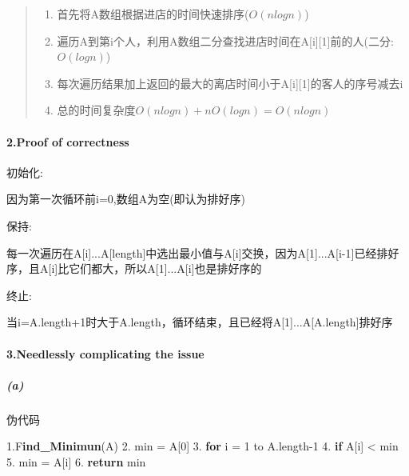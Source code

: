 \documentclass[
]{ctexart}
\newenvironment{Shaded}{}{}
\newcommand{\BuiltInTok}[1]{#1}
\newcommand{\ControlFlowTok}[1]{\textcolor[rgb]{0.00,0.44,0.13}{\textbf{#1}}}
\newcommand{\DecValTok}[1]{\textcolor[rgb]{0.25,0.63,0.44}{#1}}
\newcommand{\ErrorTok}[1]{\textcolor[rgb]{1.00,0.00,0.00}{\textbf{#1}}}
\newcommand{\FloatTok}[1]{\textcolor[rgb]{0.25,0.63,0.44}{#1}}
\newcommand{\NormalTok}[1]{#1}
\begin{document}
\begin{quote}
\begin{enumerate}
\def\labelenumi{\arabic{enumi}.}
\item
  首先将A数组根据进店的时间快速排序(\(O(nlogn)\))
\item
  遍历A到第i个人，利用A数组二分查找进店时间在A{[}i{]}{[}1{]}前的人(二分:\(O(logn)\))
\item
  每次遍历结果加上返回的最大的离店时间小于A{[}i{]}{[}1{]}的客人的序号减去i
\item
  总的时间复杂度\(O(nlogn)+nO(logn)=O(nlogn)\)
\end{enumerate}
\end{quote}

\hypertarget{header-n26}{%
\paragraph{2.Proof of correctness}\label{header-n26}}

初始化:

因为第一次循环前i=0,数组A为空(即认为排好序)

保持:

每一次遍历在A{[}i{]}...A{[}length{]}中选出最小值与A{[}i{]}交换，因为A{[}1{]}...A{[}i-1{]}已经排好序，且A{[}i{]}比它们都大，所以A{[}1{]}...A{[}i{]}也是排好序的

终止:

当i=A.length+1时大于A.length，循环结束，且已经将A{[}1{]}...A{[}A.length{]}排好序

\hypertarget{header-n34}{%
\paragraph{3.Needlessly complicating the issue}\label{header-n34}}

\hypertarget{header-n35}{%
\subparagraph{(a)}\label{header-n35}}

伪代码

\begin{Shaded}
\begin{Highlighting}[]
\FloatTok{1.}\BuiltInTok{F}\ErrorTok{ind\_Minimun}\NormalTok{(A)}
\FloatTok{2.}\NormalTok{  min = A[}\DecValTok{0}\NormalTok{]}
\FloatTok{3.}  \ControlFlowTok{for}\NormalTok{ i = }\DecValTok{1}\NormalTok{ to A.length{-}}\DecValTok{1}
\FloatTok{4.}    \ControlFlowTok{if}\NormalTok{ A[i] \textless{} min}
\FloatTok{5.}\NormalTok{      min = A[i]}
\FloatTok{6.}  \ControlFlowTok{return}\NormalTok{ min}
\end{Highlighting}
\end{Shaded}
\end{document}
